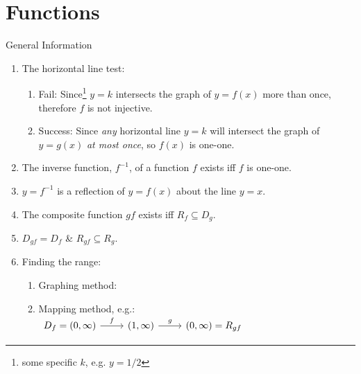 \documentclass[oneside]{book}
\begin{document}
\chapter{Functions}
\begin{stbox}{General Information}
  \begin{enumerate}
    \item The horizontal line test: 
    \begin{enumerate}
      \item Fail: Since\footnote{some specific \(k\), e.g. \(y=1/2\)} \(y=k\) intersects the graph of \(y=f(x)\) more than once, therefore \(f\) is not injective.
      \item Success: Since \emph{any} horizontal line \(y=k\) will intersect the graph of \(y=g(x)\) \emph{at most once}, so \(f(x)\) is one-one.
    \end{enumerate}  
    \item The inverse function, \(f^{-1}\), of a function \(f\) exists iff \(f\) is one-one.
    \item \(y=f^{-1}\) is a reflection of \(y=f(x)\) about the line \(y=x\).
    \item The composite function \(gf\) exists iff \(R_f \subseteq D_g\).
    \item \(D_{gf}=D_f\) \& \(R_{gf}\subseteq R_g\).
    \item Finding the range:
    \begin{enumerate}
      \item Graphing method:
      \item Mapping method, e.g.: \(\begin{tikzcd}
        {D_f=(0, \infty)} & {(1,\infty)} & {(0,\infty)=R_{gf}} & {} & {}
        \arrow["f", from=1-1, to=1-2]
        \arrow["g", from=1-2, to=1-3]
      \end{tikzcd}\)
    \end{enumerate} 
  \end{enumerate}
\end{stbox}
\end{document}
